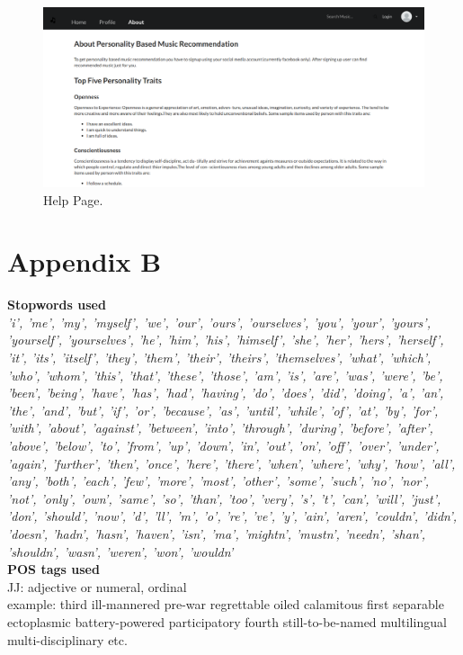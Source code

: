 \newpage
\begin{figure}[h]
  \centering
    \includegraphics[width=1\textwidth]{fig/help_screenshot.png}
    \caption{Help Page.}
\end{figure}

\newpage
\section*{Appendix B}
{\bf Stopwords used}\\


{\em 'i', 'me', 'my', 'myself', 'we', 'our', 'ours', 'ourselves', 'you', 'your', 'yours', 'yourself', 'yourselves', 'he', 'him', 'his', 'himself', 'she', 'her', 'hers', 'herself', 'it', 'its', 'itself', 'they', 'them', 'their', 'theirs', 'themselves', 'what', 'which', 'who', 'whom', 'this', 'that', 'these', 'those', 'am', 'is', 'are', 'was', 'were', 'be', 'been', 'being', 'have', 'has', 'had', 'having', 'do', 'does', 'did', 'doing', 'a', 'an', 'the', 'and', 'but', 'if', 'or', 'because', 'as', 'until', 'while', 'of', 'at', 'by', 'for', 'with', 'about', 'against', 'between', 'into', 'through', 'during', 'before', 'after', 'above', 'below', 'to', 'from', 'up', 'down', 'in', 'out', 'on', 'off', 'over', 'under', 'again', 'further', 'then', 'once', 'here', 'there', 'when', 'where', 'why', 'how', 'all', 'any', 'both', 'each', 'few', 'more', 'most', 'other', 'some', 'such', 'no', 'nor', 'not', 'only', 'own', 'same', 'so', 'than', 'too', 'very', 's', 't', 'can', 'will', 'just', 'don', 'should', 'now', 'd', 'll', 'm', 'o', 're', 've', 'y', 'ain', 'aren', 'couldn', 'didn', 'doesn', 'hadn', 'hasn', 'haven', 'isn', 'ma', 'mightn', 'mustn', 'needn', 'shan', 'shouldn', 'wasn', 'weren', 'won', 'wouldn'}\\


{\bf POS tags used}\\


JJ: adjective or numeral, ordinal\\
example: third ill-mannered pre-war regrettable oiled calamitous first separable
ectoplasmic battery-powered participatory fourth still-to-be-named
multilingual multi-disciplinary etc.


